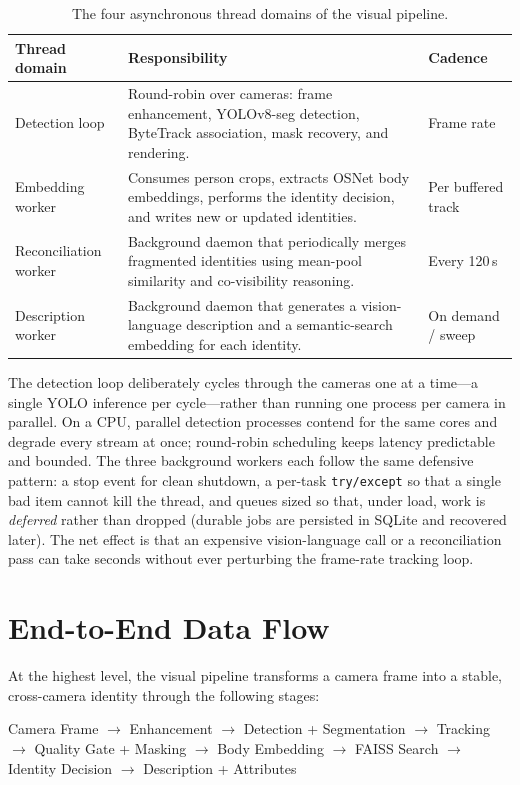 \documentclass[12pt]{report}
\begin{document}
\begin{table}[H]
\centering
\begin{tabularx}{\textwidth}{|l|X|l|}
\hline
\textbf{Thread domain} & \textbf{Responsibility} & \textbf{Cadence} \\
\hline
Detection loop & Round-robin over cameras: frame enhancement, YOLOv8-seg detection, ByteTrack association, mask recovery, and rendering. & Frame rate \\
\hline
Embedding worker & Consumes person crops, extracts OSNet body embeddings, performs the identity decision, and writes new or updated identities. & Per buffered track \\
\hline
Reconciliation worker & Background daemon that periodically merges fragmented identities using mean-pool similarity and co-visibility reasoning. & Every 120\,s \\
\hline
Description worker & Background daemon that generates a vision-language description and a semantic-search embedding for each identity. & On demand / sweep \\
\hline
\end{tabularx}
\caption{The four asynchronous thread domains of the visual pipeline.}
\label{tab:threads}
\end{table}

The detection loop deliberately cycles through the cameras one at a time---a single YOLO inference per cycle---rather than running one process per camera in parallel. On a CPU, parallel detection processes contend for the same cores and degrade every stream at once; round-robin scheduling keeps latency predictable and bounded. The three background workers each follow the same defensive pattern: a stop event for clean shutdown, a per-task \texttt{try/except} so that a single bad item cannot kill the thread, and queues sized so that, under load, work is \emph{deferred} rather than dropped (durable jobs are persisted in SQLite and recovered later). The net effect is that an expensive vision-language call or a reconciliation pass can take seconds without ever perturbing the frame-rate tracking loop.

\section{End-to-End Data Flow}
At the highest level, the visual pipeline transforms a camera frame into a stable, cross-camera identity through the following stages:

\begin{center}
Camera Frame $\rightarrow$ Enhancement $\rightarrow$ Detection + Segmentation $\rightarrow$ Tracking $\rightarrow$ Quality Gate + Masking $\rightarrow$ Body Embedding $\rightarrow$ FAISS Search $\rightarrow$ Identity Decision $\rightarrow$ Description + Attributes
\end{center}
\end{document}
